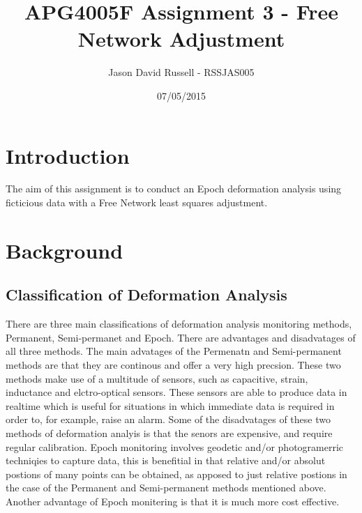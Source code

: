 \documentclass{article}
\title{APG4005F Assignment 3 - Free Network Adjustment}
\date{07/05/2015}
\author{Jason David Russell - RSSJAS005}
\begin{document}
\maketitle
{}

\newpage
\tableofcontents


\newpage
\section{Introduction}
The aim of this assignment is to conduct an Epoch deformation analysis using
ficticious data with a Free Network least squares adjustment.


\section{Background}
\subsection{Classification of Deformation Analysis}
There are three main classifications of deformation analysis monitoring methods,
Permanent, Semi-permanet and Epoch. There are advantages and disadvatages of all
three methods. The main advatages of the Permenatn and Semi-permanent methods
are that they are continous and offer a very high precsion. These two methods
make use of a multitude of sensors, such as capacitive, strain, inductance and
elctro-optical sensors. These sensors are able to produce data in realtime which
is useful for situations in which immediate data is required in order to, for
example, raise an alarm. Some of the disadvatages of these two methods of
deformation analyis is that the senors are expensive, and require regular
calibration. Epoch monitoring involves geodetic and/or photogramerric techniqies
to capture data, this is benefitial in that relative and/or absolut postions of
many points can be obtained, as apposed to just relative postions in the case
of the Permanent and Semi-permanent methods mentioned above. Another advantage
of Epoch monitering is that it is much more cost effective.
\end{document}
